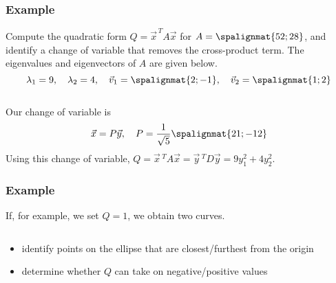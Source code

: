 \begin{frame}\frametitle{Example}
    
    Compute the quadratic form $Q = \vec x^{\,T} A \vec x$ for $A = \spalignmat{5 2;2 8}$, and identify a change of variable that removes the cross-product term. The eigenvalues and eigenvectors of $A$ are given below. 
    $$\lambda_1 = 9, \quad \lambda_2 = 4, \quad \vec v_1 = \spalignmat{2;-1}, \quad \vec v_2 = \spalignmat{1;2}$$
    \pause
    \\
    Our change of variable is $$\vec x = P \vec y, \quad P = \frac{1}{\sqrt5}\spalignmat{2 1;-1 2}$$
    Using this change of variable,
    $Q = \vec x\, ^TA\vec x = \vec y\, ^T D \vec y = 9y_1^2 + 4y_2^2$.
\end{frame}


\begin{frame}\frametitle{Example}
    If, for example, we set $Q=1$, we obtain two curves. 
    \vspace{-12pt}
    \begin{columns}
    \begin{column}{.35\textwidth}
    \begin{center}
             \end{center}
    \end{column}\begin{column}{.35\textwidth}\begin{center}
                         \end{center}
    \end{column}
    \end{columns} 
    \vspace{18pt}
    \begin{itemize}
        \item<5-> identify points on the ellipse that are closest/furthest from the origin
        \item<6-> determine whether $Q$ can take on negative/positive values
    \end{itemize}
    
    
\end{frame}





